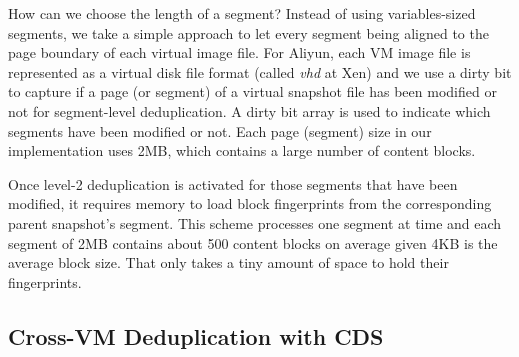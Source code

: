 How can we choose the length of a segment?
Instead of using variables-sized segments, we take a simple approach
to let every segment being aligned to the page boundary of each virtual image file.
For Aliyun, each VM image file is represented as a virtual disk file format
(called \emph{vhd} at Xen) and we use a dirty bit to capture if a page (or segment) of a virtual snapshot file 
has been modified or not for segment-level deduplication.
A dirty bit array is used to indicate which segments have been modified or not. 
Each page (segment) size in our implementation uses 2MB, which contains a large number of content blocks.






Once level-2 deduplication is activated for those segments that have been modified,
it requires memory to load  block fingerprints from the corresponding
parent snapshot's segment.
This scheme processes one segment at time and each segment of 2MB contains about 
500 content blocks on average given 4KB is the average block size.
That only takes a tiny amount of space to hold their fingerprints.

\subsection{Cross-VM Deduplication with CDS}

